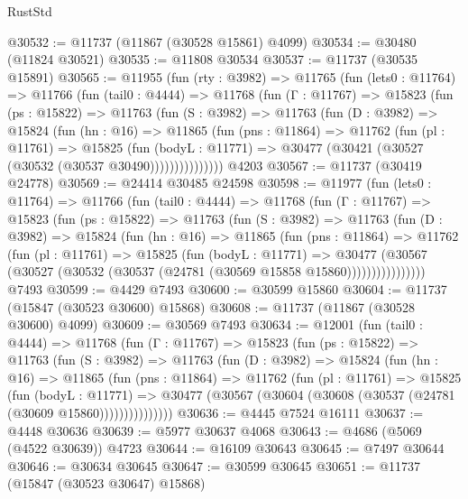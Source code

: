 \begin{lexlean}{RustStd}
\begin{coremodule}
@30532 := @11737 (@11867 (@30528 @15861) @4099)
@30534 := @30480 (@11824 @30521)
@30535 := @11808 @30534
@30537 := @11737 (@30535 @15891)
@30565 := @11955
    (fun (rty : @3982) =>
    @11765
      (fun (lets0 : @11764) =>
      @11766
        (fun (tail0 : @4444) =>
        @11768
          (fun (Γ : @11767) =>
          @15823
            (fun (ps : @15822) =>
            @11763
              (fun (S : @3982) =>
              @11763
                (fun (D : @3982) =>
                @15824
                  (fun (hn : @16) =>
                  @11865
                    (fun (pns : @11864) =>
                    @11762
                      (fun (pl : @11761) =>
                      @15825
                        (fun (bodyL : @11771) =>
                        @30477 (@30421 (@30527 (@30532 (@30537 @30490)))))))))))))))
    @4203
@30567 := @11737 (@30419 @24778)
@30569 := @24414 @30485 @24598
@30598 := @11977
    (fun (lets0 : @11764) =>
    @11766
      (fun (tail0 : @4444) =>
      @11768
        (fun (Γ : @11767) =>
        @15823
          (fun (ps : @15822) =>
          @11763
            (fun (S : @3982) =>
            @11763
              (fun (D : @3982) =>
              @15824
                (fun (hn : @16) =>
                @11865
                  (fun (pns : @11864) =>
                  @11762
                    (fun (pl : @11761) =>
                    @15825
                      (fun (bodyL : @11771) =>
                      @30477
                        (@30567
                          (@30527 (@30532 (@30537 (@24781 (@30569 @15858 @15860))))))))))))))))
    @7493
@30599 := @4429 @7493
@30600 := @30599 @15860
@30604 := @11737 (@15847 (@30523 @30600) @15868)
@30608 := @11737 (@11867 (@30528 @30600) @4099)
@30609 := @30569 @7493
@30634 := @12001
    (fun (tail0 : @4444) =>
    @11768
      (fun (Γ : @11767) =>
      @15823
        (fun (ps : @15822) =>
        @11763
          (fun (S : @3982) =>
          @11763
            (fun (D : @3982) =>
            @15824
              (fun (hn : @16) =>
              @11865
                (fun (pns : @11864) =>
                @11762
                  (fun (pl : @11761) =>
                  @15825
                    (fun (bodyL : @11771) =>
                    @30477 (@30567 (@30604 (@30608 (@30537 (@24781 (@30609 @15860)))))))))))))))
@30636 := @4445 @7524 @16111
@30637 := @4448 @30636
@30639 := @5977 @30637 @4068
@30643 := @4686 (@5069 (@4522 @30639)) @4723
@30644 := @16109 @30643
@30645 := @7497 @30644
@30646 := @30634 @30645
@30647 := @30599 @30645
@30651 := @11737 (@15847 (@30523 @30647) @15868)

\end{coremodule}
\end{lexlean}
